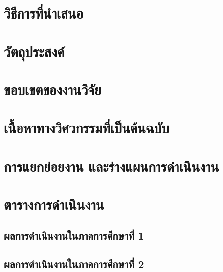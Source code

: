 \section{วิธีการที่นำเสนอ}
\section{วัตถุประสงค์}
\section{ขอบเขตของงานวิจัย}
\section{เนื้อหาทางวิศวกรรมที่เป็นต้นฉบับ}
\section{การแยกย่อยงาน และร่างแผนการดำเนินงาน}
\section{ตารางการดำเนินงาน}
\subsection{ผลการดำเนินงานในภาคการศึกษาที่ 1}
\subsection{ผลการดำเนินงานในภาคการศึกษาที่ 2}
